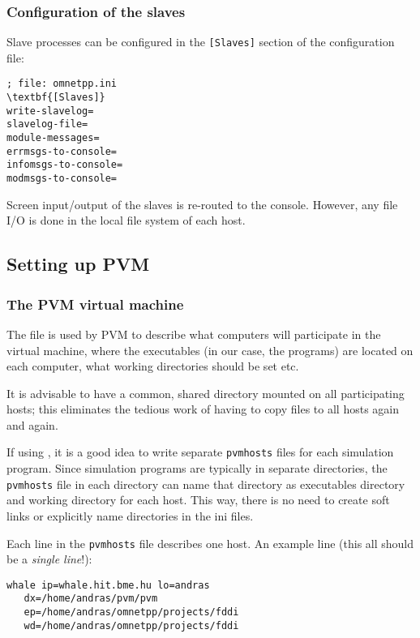 \subsubsection{Configuration of the slaves}

Slave processes can be configured in the \texttt{[Slaves]} section of
the configuration file:

\begin{Verbatim}[commandchars=\\\{\}]
; file: omnetpp.ini
\textbf{[Slaves]}
write-slavelog=
slavelog-file=
module-messages=
errmsgs-to-console=
infomsgs-to-console=
modmsgs-to-console=
\end{Verbatim}

Screen input/output of the slaves is re-routed to the console.
However, any file I/O is done in the local file system of each host.



\subsection{Setting up PVM}

\subsubsection{The PVM virtual machine}


The  file is used by PVM to describe what computers will
participate in the virtual machine, where the executables (in our
case, the {\opp} programs) are located on each computer, what working
directories should be set etc.


It is advisable to have a common, shared directory mounted on all
participating hosts; this eliminates the tedious work of having to
copy files to all hosts again and again.


If using {\opp}, it is a good idea to write separate \texttt{pvmhosts}
files for each simulation program. Since simulation programs are
typically in separate directories, the \texttt{pvmhosts} file in each
directory can name that directory as executables directory and working
directory for each host. This way, there is no need to create soft
links or explicitly name directories in the {\opp} ini files.


Each line in the \texttt{pvmhosts} file describes one host. An example
line (this all should be a \textit{single line}!):

\begin{verbatim}
whale ip=whale.hit.bme.hu lo=andras
   dx=/home/andras/pvm/pvm
   ep=/home/andras/omnetpp/projects/fddi
   wd=/home/andras/omnetpp/projects/fddi
\end{verbatim}

